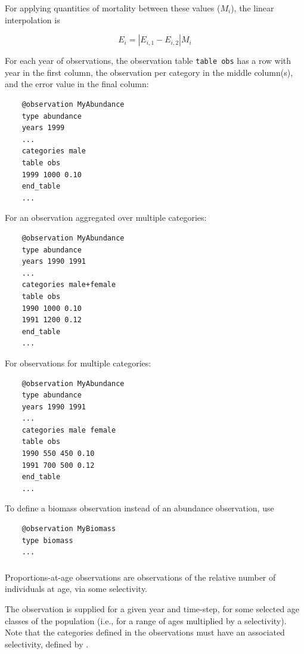 For applying quantities of mortality between these values ($M_i$), the linear interpolation is

\begin{equation}
	E_{i} = |E_{i,1} - E_{i,2}|  M_i
\end{equation}

For each year of observations, the observation table \texttt{table obs} has a row with year in the first column, the observation per category in the middle column(s), and the error value in the final column:

{\small{\begin{verbatim}
	@observation MyAbundance
	type abundance
	years 1999
	...
	categories male
	table obs
	1999 1000 0.10
	end_table
	...
\end{verbatim}}}

For an observation aggregated over multiple categories:

{\small{\begin{verbatim}
	@observation MyAbundance
	type abundance
	years 1990 1991
	...
	categories male+female
	table obs
	1990 1000 0.10
	1991 1200 0.12
	end_table
	...
\end{verbatim}}}

For observations for multiple categories:

{\small{\begin{verbatim}
	@observation MyAbundance
	type abundance
	years 1990 1991
	...
	categories male female
	table obs
	1990 550 450 0.10
	1991 700 500 0.12
	end_table
	...
\end{verbatim}}}

To define a biomass observation instead of an abundance observation, use

{\small{\begin{verbatim}
	@observation MyBiomass
	type biomass
	...
\end{verbatim}}}

\ifAgeBased
\subsubsection{}\label{sec:Observation-ProportionsAtAge}

Proportions-at-age observations are observations of the relative number of individuals at age, via some selectivity.

The observation is supplied for a given year and time-step, for some selected age classes of the population (i.e., for a range of ages multiplied by a selectivity). Note that the categories defined in the observations must have an associated selectivity, defined by .

